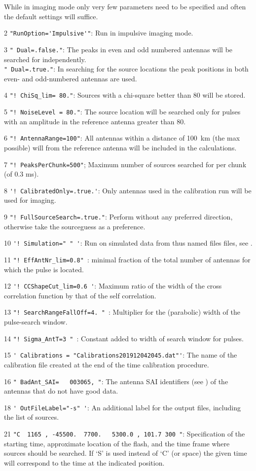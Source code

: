 While in imaging mode only very few parameters need to be specified and often the default settings will suffice.
\begin{enumerate*}
\item[2] \verb#"RunOption='Impulsive'"#: Run in impulsive imaging mode.
\item[3] \verb!" Dual=.false."!: The peaks in even and odd numbered antennas will be searched for independently.  \\
    \verb!" Dual=.true."!: In searching for the source locations the peak positions in both even- and odd-numbered antennas are used.
\item[4] \verb#"! ChiSq_lim= 80."#: Sources with a chi-square better than 80 will be stored.
\item[5] \verb#"! NoiseLevel = 80."#: The source location will be searched only for pulses with an amplitude in the reference antenna greater than 80.
\item[6] \verb#"! AntennaRange=100"#: All antennas within a distance of 100~km (the max possible) will from the reference antenna will be included in the calculations.
\item[7] \verb#"! PeaksPerChunk=500"#; Maximum number of sources searched for per chunk (of 0.3 ms).
\item[8] \verb#'! CalibratedOnly=.true.'#: Only antennas used in the calibration run will be used for imaging.
\item[9] \verb#"! FullSourceSearch=.true."#: Perform without any preferred direction, otherwise take the sourceguess as a preference.
\item[10] \verb#'! Simulation=" " '#: Run on simulated data from thus named files files, see .
\item[11] \verb#"! EffAntNr_lim=0.8" #:  minimal fraction of the total number of antennas for which the pulse is located.
\item[12] \verb#'! CCShapeCut_lim=0.6 '#:  Maximum ratio of the width of the cross correlation function by that of the self correlation.
\item[13] \verb#"! SearchRangeFallOff=4. " #:  Multiplier for the (parabolic) width of the pulse-search window.
\item[14] \verb#"! Sigma_AntT=3 " #:  Constant added to width of search window for pulses.
\item[15] \verb!' Calibrations = "Calibrations201912042045.dat"'!: The name of the calibration file created at the end of the time calibration procedure.
\item[16] \verb#" BadAnt_SAI=   003065, "#: The antenna SAI identifiers (see ) of the antennas that do not have good data.
\item[18] \verb#' OutFileLabel="-s" '#: An additional label for the output files, including the list of sources.
\item[21] \verb#"C  1165 , -45500.  7700.   5300.0 , 101.7 300 "#: Specification of the starting time, approximate location of the flash, and the time frame where sources should be searched. If `S' is used instead of `C' (or space) the given time will correspond to the time at the indicated position.
\end{enumerate*}

